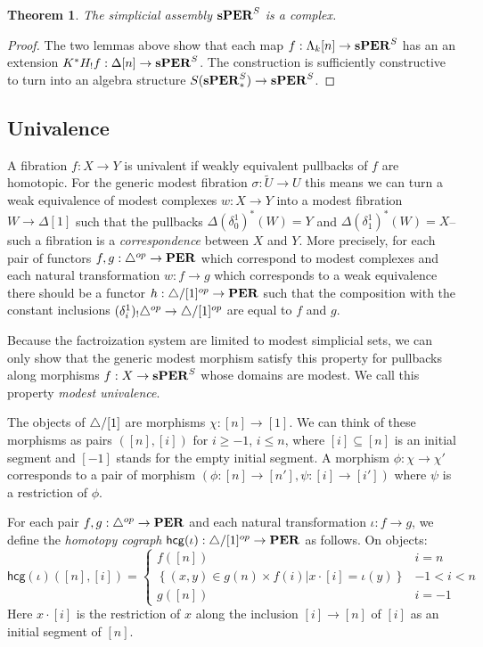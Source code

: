 \documentclass{amsart}
\theoremstyle{plain}
\newtheorem{theorem}{Theorem}
\theoremstyle{definition}
\newcommand\set[1]{\left\{#1\right\}}
\newcommand\ri{^*}
\begin{document}
\begin{theorem} The simplicial assembly $\mathbf{s}\mathbf{PER}^S$ is a complex. \label{complex} \end{theorem}

\begin{proof} The two lemmas above show that each map $f:\Lambda_k[n] \to \mathbf{s}\mathbf{PER}^S$ has an an extension $K^*H_!f:\Delta[n] \to \mathbf{s}\mathbf{PER}^S$. The construction is sufficiently constructive to turn into an algebra structure $S(\mathbf{s}\mathbf{PER}_*^S) \to \mathbf{s}\mathbf{PER}^S$. \end{proof}


\subsection{Univalence}
A fibration $f:X\to Y$ is univalent if weakly equivalent pullbacks of $f$ are homotopic. For the generic modest fibration $\sigma:\tilde U \to U$ this means we can turn a weak equivalence of modest complexes $w:X\to Y$ into a modest fibration $W\to \Delta[1]$ such that the pullbacks $\Delta(\delta^1_0)\ri(W) = Y$ and $\Delta(\delta^1_1)\ri(W) = X$--such a fibration is a \emph{correspondence} between $X$ and $Y$. More precisely, for each pair of functors $f,g:{\mathord{\triangle}}^{op}\to\mathbf{PER}$ which correspond to modest complexes and each natural transformation $w:f\to g$ which corresponds to a weak equivalence there should be a functor $h:{\mathord{\triangle}}/[1]^{op} \to \mathbf{PER}$ such that the composition with the constant inclusions $(\delta^1_i)_!{\mathord{\triangle}}^{op}\to {\mathord{\triangle}}/[1]^{op}$ are equal to $f$ and $g$. 

Because the factroization system are limited to modest simplicial sets, we can only show that the generic modest morphism satisfy this property for pullbacks along morphisms $f:X\to \mathbf{s}\mathbf{PER}^S$ whose domains are modest. We call this property \emph{modest univalence}.

The objects of ${\mathord{\triangle}}/[1]$ are morphisms $\chi:[n]\to [1]$. We can think of these morphisms as pairs $([n],[i])$ for $i\geq -1$, $i\leq n$, where $[i]\subseteq [n]$ is an initial segment and $[-1]$ stands for the empty initial segment. A morphism $\phi:\chi\to\chi'$ corresponds to a pair of morphism $(\phi:[n]\to[n'],\psi:[i]\to [i'])$ where $\psi$ is a restriction of $\phi$. 

\newcommand\hcg{\mathsf{hcg}}
For each pair $f,g:{\mathord{\triangle}}^{op}\to\mathbf{PER}$ and each natural transformation $\iota:f\to g$, we define the \emph{homotopy cograph} $\hcg(\iota):\simcat/[1]\dual \to \pers$ as follows. On objects:
\[ \hcg(\iota)([n],[i]) = \left\{\begin{array}{cc}
f([n]) & i=n \\
\set{(x,y)\in g(n)\times f(i)| x\cdot [i] = \iota(y)} & -1< i < n \\
g([n]) & i=-1
\end{array}\right.\]
Here $x\cdot [i]$ is the restriction of $x$ along the inclusion $[i]\to [n]$ of $[i]$ as an initial segment of $[n]$.
\end{document}
